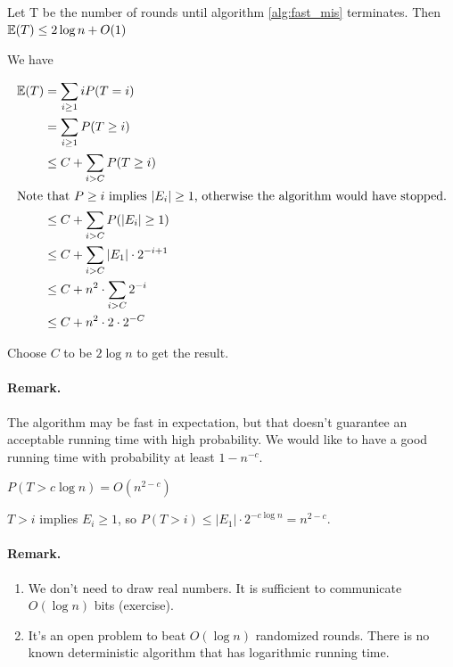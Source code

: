 \begin{lem} Let T be the number of rounds until algorithm \ref{alg:fast_mis} terminates. Then $\mathbb{E}(T) \leq 2\log n+O(1)$\end{lem}

\begin{pr} We have

\begin{align*}
\mathbb{E}(T) &= \sum_{i\geq 1} i P(T=i) \\
	&= \sum_{i\geq 1} P(T\geq i)\\
	&\leq C + \sum_{i> C} P(T\geq i)\\
\intertext{Note that $P\geq i$ implies $|E_i|\geq 1$, otherwise the algorithm would have stopped.}
	&\leq C+ \sum_{i> C} P(|E_i|\geq 1)\\
	&\leq C+ \sum_{i>C} |E_1|\cdot 2^{-i+1}\\
	&\leq C+ n^2 \cdot \sum_{i>C} 2^{-i}\\
	&\leq C+ n^2 \cdot 2\cdot 2^{-C}\\
\end{align*}

Choose $C$ to be $2\log n$ to get the result.
\end{pr}

\paragraph{Remark.} The algorithm may be fast in expectation, but that doesn't guarantee an acceptable running time with high probability. We would like to have a good running time with probability at least $1-n^{-c}$.

\begin{thm} $P(T> c\log n) = O(n^{2-c})$\end{thm}
\begin{pr} $T>i$ implies $E_i\geq 1$, so $P(T > i) \leq |E_1| \cdot 2^{-c\log n} = n^{2-c}$.\end{pr}

\paragraph{Remark.} \begin{enumerate}
\item We don't need to draw real numbers. It is sufficient to communicate $O(\log n)$ bits (exercise). 
\item It's an open problem to beat $O(\log n)$ randomized rounds. There is no known deterministic algorithm that has logarithmic running time.
\end{enumerate}

